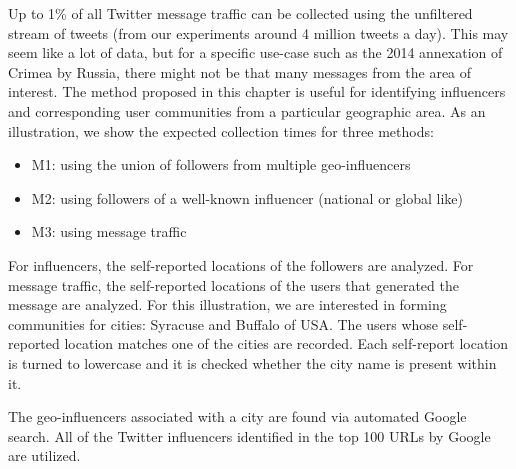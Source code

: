 Up to 1\% of all Twitter message traffic can be collected using the unfiltered stream of tweets (from our experiments around 4 million tweets a day). This may seem like a lot of data, but for a specific use-case such as the 2014 annexation of Crimea by Russia, there might not be that many messages from the area of interest. The method proposed in this chapter is useful for identifying influencers and corresponding user communities from a particular geographic area. As an illustration, we show the expected collection times for three methods:
\begin{itemize}
\item  M1: using the union of followers from multiple geo-influencers
\item M2: using followers of a well-known influencer (national or global like)
\item M3: using message traffic
\end{itemize}

For influencers, the self-reported locations of the followers are analyzed. For message traffic, the self-reported locations of the users that generated the message are analyzed. For this illustration, we are interested in forming communities for cities: Syracuse and Buffalo of USA. The users whose self-reported location matches one of the cities are recorded. Each self-report location is turned to lowercase and it is checked whether the city name is present within it.

The geo-influencers associated with a city are found via automated Google search. All of the Twitter influencers identified in the top 100 URLs by Google are utilized. %

